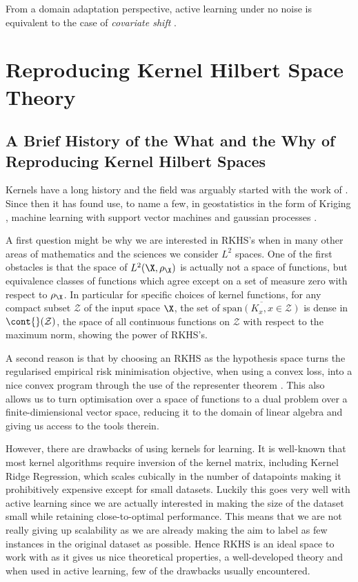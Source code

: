 From a domain adaptation perspective, active learning under no noise is
equivalent to the case of \emph{covariate shift}
\citep{gretton09_covar_shift_by_kernel_mean_match}.

\section{Reproducing Kernel Hilbert Space Theory}
\label{sec:rkhs-theory}

\subsection{A Brief History of the What and the Why of Reproducing Kernel
Hilbert Spaces}
\label{sec:a-brief-hisory-RKHS} Kernels have a long history and the field was
arguably started with the work of \citep{aronszajn50_theor_reprod_kernel}. Since
then it has found use, to name a few, in geostatistics in the form of Kriging
\citep{cressie90_origin_krigin}, machine learning with support vector machines
\citep{evgeniou99_suppor} and gaussian processes \citep{williams96_gauss}.

A first question might be why we are interested in RKHS's when in many other
areas of mathematics and the sciences we consider \(L^{2}\) spaces. One of the
first obstacles is that the space of \(L^{2}(\X, \rho_{\X})\) is actually not a
space of functions, but equivalence classes of functions which agree except on a
set of measure zero with respect to \(\rho_{\X}\). In particular for specific
choices of kernel functions, for any compact subset \(\mathcal{Z}\) of the input
space \(\X\), the set of \(\overline{\textrm{span}(K_x, x \in \mathcal{Z})}\) is
dense in \(\cont{}(\mathcal{Z})\), the space of all continuous functions on
\(\mathcal{Z}\) with respect to the maximum norm, showing the power of RKHS's.

A second reason is that by choosing an RKHS as the hypothesis space turns the
regularised empirical risk minimisation objective, when using a convex loss,
into a nice convex program through the use of the representer theorem
\citep["Large" Reproducing Kernel Hilbert
Spaces]{gretton18_advan_topic_machin_learn}. This also allows us to turn
optimisation over a space of functions to a dual problem over a
finite-dimiensional vector space, reducing it to the domain of linear algebra
and giving us access to the tools therein.

However, there are drawbacks of using kernels for learning. It is well-known
that most kernel algorithms require inversion of the kernel matrix, including
Kernel Ridge Regression, which scales cubically in the number of datapoints
\citep{saunders98_ridge_regres_learn_algor_dual_variab} making it prohibitively
expensive except for small datasets. Luckily this goes very well with active
learning since we are actually interested in making the size of the dataset
small while retaining close-to-optimal performance. This means that we are not
really giving up scalability as we are already making the aim to label as few
instances in the original dataset as possible. Hence RKHS is an ideal space to
work with as it gives us nice theoretical properties, a well-developed theory
and when used in active learning, few of the drawbacks usually encountered.

